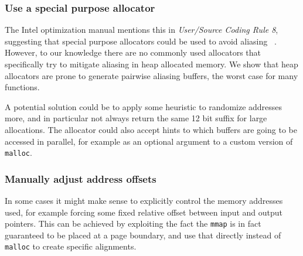 \documentclass[10pt, conference, compsocconf]{IEEEtran}
\begin{document}
\subsubsection{Use a special purpose allocator}
The Intel optimization manual mentions this in \emph{User/Source Coding Rule 8}, suggesting that special purpose allocators could be used to avoid aliasing ~\cite{OptimizationManual}.
However, to our knowledge there are no commonly used allocators that specifically try to mitigate aliasing in heap allocated memory.
We show that heap allocators are prone to generate pairwise aliasing buffers, the worst case for many functions.


A potential solution could be to apply some heuristic to randomize addresses more, and in particular not always return the same 12 bit suffix for large allocations.
The allocator could also accept hints to which buffers are going to be accessed in parallel, for example as an optional argument to a custom version of \texttt{malloc}.

\subsubsection{Manually adjust address offsets}
In some cases it might make sense to explicitly control the memory addresses used, for example forcing some fixed relative offset between input and output pointers.
This can be achieved by exploiting the fact the \texttt{mmap} is in fact guaranteed to be placed at a page boundary, and use that directly instead of \texttt{malloc} to create specific alignments.

\end{document}
